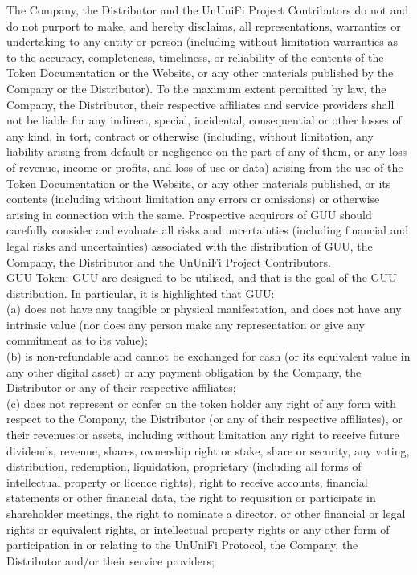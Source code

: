 \documentclass[dvipdfmx]{jsarticle}
\begin{document}
The Company, the Distributor and the UnUniFi Project Contributors do not and do not purport to make, and hereby disclaims, all representations, warranties or undertaking to any entity or person (including without limitation warranties as to the accuracy, completeness, timeliness, or reliability of the contents of the Token Documentation or the Website, or any other materials published by the Company or the Distributor). To the maximum extent permitted by law, the Company, the Distributor, their respective affiliates and service providers shall not be liable for any indirect, special, incidental, consequential or other losses of any kind, in tort, contract or otherwise (including, without limitation, any liability arising from default or negligence on the part of any of them, or any loss of revenue, income or profits, and loss of use or data) arising from the use of the Token Documentation or the Website, or any other materials published, or its contents (including without limitation any errors or omissions) or otherwise arising in connection with the same. Prospective acquirors of GUU should carefully consider and evaluate all risks and uncertainties (including financial and legal risks and uncertainties) associated with the distribution of GUU, the Company, the Distributor and the UnUniFi Project Contributors.\\
GUU Token: GUU are designed to be utilised, and that is the goal of the GUU distribution. In particular, it is highlighted that GUU:\\
(a)	does not have any tangible or physical manifestation, and does not have any intrinsic value (nor does any person make any representation or give any commitment as to its value);\\
(b)	is non-refundable and cannot be exchanged for cash (or its equivalent value in any other digital asset) or any payment obligation by the Company, the Distributor or any of their respective affiliates;\\
(c)	does not represent or confer on the token holder any right of any form with respect to the Company, the Distributor (or any of their respective affiliates), or their revenues or assets, including without limitation any right to receive future dividends, revenue, shares, ownership right or stake, share or security, any voting, distribution, redemption, liquidation, proprietary (including all forms of intellectual property or licence rights), right to receive accounts, financial statements or other financial data, the right to requisition or participate in shareholder meetings, the right to nominate a director, or other financial or legal rights or equivalent rights, or intellectual property rights or any other form of participation in or relating to the UnUniFi Protocol, the Company, the Distributor and/or their service providers;\\
\end{document}
